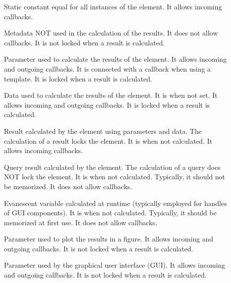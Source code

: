 \documentclass{tufte-handout}
\begin{document}
\begin{fullwidth}
\begin{tcolorbox}[
	title=Property Categories
]
\begin{description} 
 	\item[] Static constant equal for all instances of the element. It allows incoming callbacks.
 
 	\item[] Metadata NOT used in the calculation of the results. It does not allow callbacks. It is not locked when a result is calculated.
 
 	\item[] Parameter used to calculate the results of the element. It allows incoming and outgoing callbacks. It is connected with a callback when using a template. It is locked when a result is calculated.
 
 	\item[] Data used to calculate the results of the element. It is  when not set. It allows incoming and outgoing callbacks. It is locked when a result is calculated.
 
 	\item[] Result calculated by the element using parameters and data. The calculation of a result locks the element. It is  when not calculated. It allows incoming callbacks.
 
 	\item[] Query result calculated by the element. The calculation of a query does NOT lock the element. It is  when not calculated. Typically, it should not be memorized.
It does not allow callbacks.
 
 	\item[] Evanescent variable calculated at runtime (typically employed for handles of GUI components). It is  when not calculated. Typically, it should be memorized at first use.
It does not allow callbacks.
 
 	\item[] Parameter used to plot the results in a figure. It allows incoming and outgoing callbacks. It is not locked when a result is calculated.
                
 	\item[] Parameter used by the graphical user interface (GUI). It allows incoming and outgoing callbacks. It is not locked when a result is calculated.
\end{description}
\end{tcolorbox}
\end{fullwidth}
\end{document}
